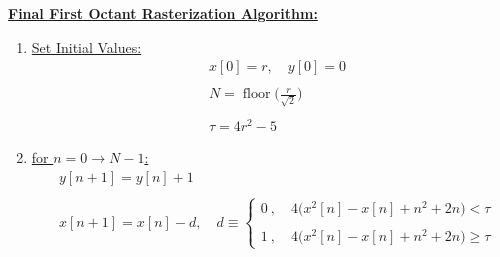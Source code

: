 \documentclass{article}
\DeclareMathOperator{\floor}{floor}
\begin{document}
\underline{\textbf{Final First Octant Rasterization Algorithm:}} \\
\begin{enumerate}
    \item \underline{Set Initial Values:} 
          \begin{align*}
                &x[0] = r, \quad y[0] = 0 \\ \\
                &N = \floor\Bigg(\frac{r}{\sqrt{2}}\Bigg) \\ \\
                &\tau = 4r^{2} - 5
            \end{align*}
    \item \underline{for $n = 0 \rightarrow N - 1$:} \\
          \begin{align*}
            &y[n + 1] = y[n] + 1 \\ \\
            &x[n + 1] = x[n] - d, \quad d \equiv \begin{cases}
                                                     0 \ , \quad 4\Big(x^{2}[n] - x[n] + n^{2} + 2n\Big) < \tau \\ \\
                                                     1 \ , \quad 4\Big(x^{2}[n] - x[n] + n^{2} + 2n\Big) \geq \tau
                                                   \end{cases}
      \end{align*}
\end{enumerate}
\end{document}
